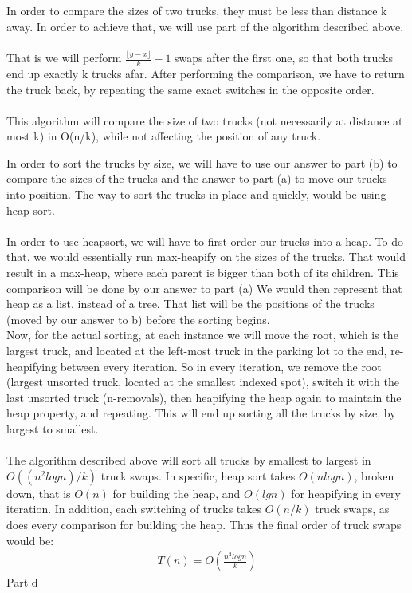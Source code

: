 \documentclass[12pt,twoside]{article}
\begin{document}
\begin{problems}
\begin{problemparts}
\problempart 
In order to compare the sizes of two trucks, they must be less than distance k away. In order to achieve that, we will use part of the algorithm described above. \\\\That is we will perform $\frac{\lfloor y-x \rfloor}{k} -1$ swaps after the first one, so that both trucks end up exactly k trucks afar. After performing the comparison, we have to return the truck back, by repeating the same exact switches in the opposite order.\\\\
This algorithm will compare the size of two trucks (not necessarily at distance at most k) in O(n/k), while not affecting the position of any truck.

\problempart 

In order to sort the trucks by size, we will have to use our answer to part (b) to compare the sizes of the trucks and the answer to part (a) to move our trucks into position. The way to sort the trucks in place and quickly, would be using heap-sort. 
\\\\
In order to use heapsort, we will have to first order our trucks into a heap. To do that, we would essentially run max-heapify on the sizes of the trucks. That would result in a max-heap, where each parent is bigger than both of its children. This comparison will be done by our answer to part (a) We would then represent that heap as a list, instead of a tree. That list will be the positions of the trucks (moved by our answer to b) before the sorting begins.
\\
Now, for the actual sorting, at each instance we will move the root, which is the largest truck, and located at the left-most truck in the parking lot to the end, re-heapifying between every iteration. So in every iteration, we remove the root (largest unsorted truck, located at the smallest indexed spot), switch it with the last unsorted truck (n-removals), then heapifying the heap again to maintain the heap property, and repeating. This will end up sorting all the trucks by size, by largest to smallest.\\\\

The algorithm described above will sort all trucks by smallest to largest in $O((n^2logn)/k)$ truck swaps. In specific, heap sort takes $O(nlogn)$, broken down, that is $O(n)$ for building the heap, and $O(lgn)$ for heapifying in every iteration. In addition, each switching of trucks takes $O(n/k)$ truck swaps, as does every comparison for building the heap. Thus the final order of truck swaps would be:
\begin{align*}
T(n)=O(\frac{n^2logn}{k})
\end{align*}    
\problempart Part d %
\end{problemparts}


\end{problems}
\end{document}
